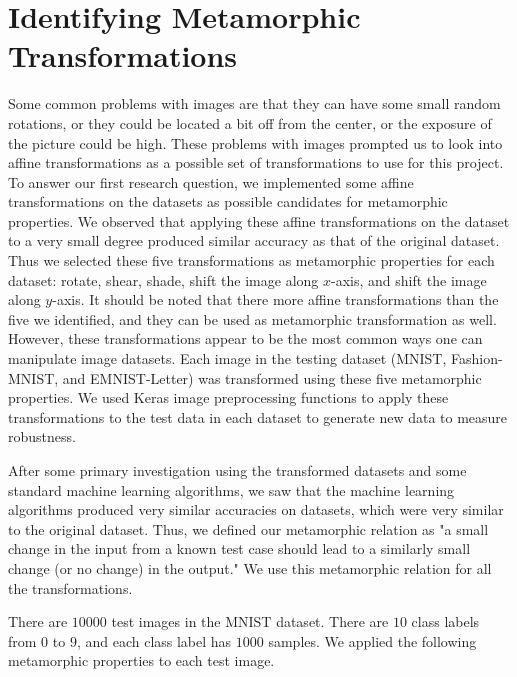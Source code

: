 \section{Identifying Metamorphic Transformations} \label{identifyingMR}
Some common problems with images are that they can have some small random rotations, or they could be located a bit off from the center, or the exposure of the picture could be high. These problems with images prompted us to look into affine transformations as a possible set of transformations to use for this project. To answer our first research question, we implemented some affine transformations on the datasets as possible candidates for metamorphic properties. We observed that applying these affine transformations on the dataset to a very small degree produced similar accuracy as that of the original dataset. Thus we selected these five transformations as metamorphic properties for each dataset: rotate, shear, shade, shift the image along $x$-axis, and shift the image along $y$-axis. It should be noted that there more affine transformations than the five we identified, and they can be used as metamorphic transformation as well. However, these transformations appear to be the most common ways one can manipulate image datasets. Each image in the testing dataset (MNIST, Fashion-MNIST, and EMNIST-Letter) was transformed using these five metamorphic properties. We used Keras image preprocessing functions to apply these transformations to the test data in each dataset to generate new data to measure robustness.

After some primary investigation using the transformed datasets and some standard machine learning algorithms, we saw that the machine learning algorithms produced very similar accuracies on datasets, which were very similar to the original dataset. Thus, we defined our metamorphic relation as "a small change in the input from a known test case should lead to a similarly small change (or no change) in the output." We use this metamorphic relation for all the transformations.

There are $10000$ test images in the MNIST dataset. There are $10$ class labels from $0$ to $9$, and each class label has $1000$ samples. We applied the following metamorphic properties to each test image.
